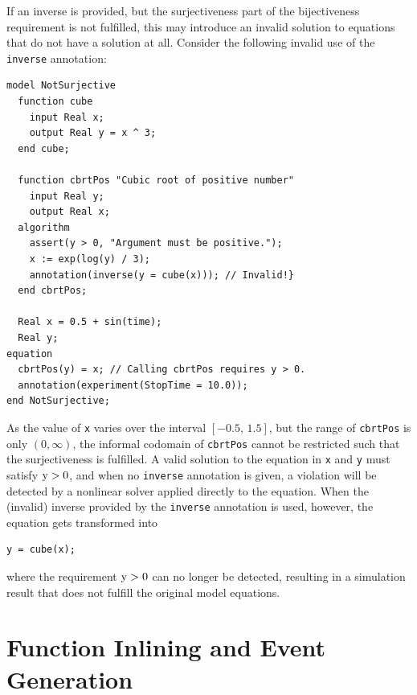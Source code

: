\begin{example}
If an inverse is provided, but the surjectiveness part of the bijectiveness requirement is not fulfilled, this may introduce an invalid solution to equations that do not have a solution at all.
Consider the following invalid use of the {\lstinline!inverse!} annotation:
\begin{lstlisting}[language=modelica]
model NotSurjective
  function cube
    input Real x;
    output Real y = x ^ 3;
  end cube;

  function cbrtPos "Cubic root of positive number"
    input Real y;
    output Real x;
  algorithm
    assert(y > 0, "Argument must be positive.");
    x := exp(log(y) / 3);
    annotation(inverse(y = cube(x))); // Invalid!}
  end cbrtPos;

  Real x = 0.5 + sin(time);
  Real y;
equation
  cbrtPos(y) = x; // Calling cbrtPos requires y > 0.
  annotation(experiment(StopTime = 10.0));
end NotSurjective;
\end{lstlisting}
As the value of {\lstinline!x!} varies over the interval $[-0.5,\, 1.5]$, but the range of {\lstinline!cbrtPos!} is only $(0, \infty)$, the informal codomain of {\lstinline!cbrtPos!} cannot be restricted such that the surjectiveness is fulfilled.
A valid solution to the equation in {\lstinline!x!} and {\lstinline!y!} must satisfy $\text{{\lstinline!y!}} > 0$, and when no {\lstinline!inverse!} annotation is given, a violation will be detected by a nonlinear solver applied directly to the equation.
When the (invalid) inverse provided by the {\lstinline!inverse!} annotation is used, however, the equation gets transformed into
\begin{lstlisting}[language=modelica]
  y = cube(x);
\end{lstlisting}
where the requirement $\text{{\lstinline!y!}} > 0$ can no longer be detected, resulting in a simulation result that does not fulfill the original model equations.
\end{example}
\section{Function Inlining and Event Generation}\label{function-inlining-and-event-generation}

